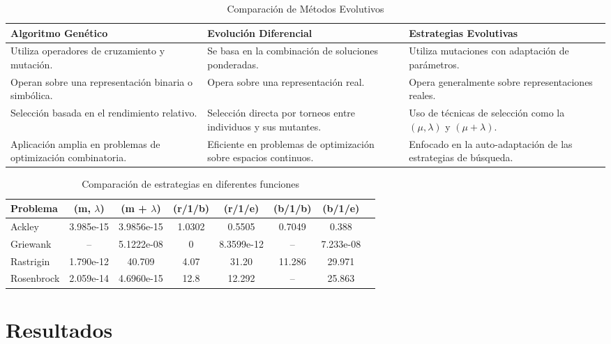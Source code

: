 \documentclass{report}
\begin{document}
\begin{table}[ht]
    \centering
    \caption{Comparación de Métodos Evolutivos}
    \label{tab:comparacion_metodos}
    \begin{tabularx}{\textwidth}{X|X|X}
    \toprule
    \textbf{Algoritmo Genético} & \textbf{Evolución Diferencial} & \textbf{Estrategias Evolutivas} \\
    \midrule
    Utiliza operadores de cruzamiento y mutación. & Se basa en la combinación de soluciones ponderadas. & Utiliza mutaciones con adaptación de parámetros. \\
    \addlinespace
    Operan sobre una representación binaria o simbólica. & Opera sobre una representación real. & Opera generalmente sobre representaciones reales. \\
    \addlinespace
    Selección basada en el rendimiento relativo. & Selección directa por torneos entre individuos y sus mutantes. & Uso de técnicas de selección como la $(\mu, \lambda)$ y $(\mu+\lambda)$. \\
    \addlinespace
    Aplicación amplia en problemas de optimización combinatoria. & Eficiente en problemas de optimización sobre espacios continuos. & Enfocado en la auto-adaptación de las estrategias de búsqueda. \\
    \bottomrule
    \end{tabularx}
\end{table}

\begin{table}[ht]
\centering
\caption{Comparación de estrategias en diferentes funciones}
\begin{tabular}{>{\raggedright}p{3cm}ccccccc}
\toprule
\textbf{Problema} & \textbf{(m, $\lambda$)} & \textbf{(m + $\lambda$)} & \textbf{(r/1/b)} & \textbf{(r/1/e)} & \textbf{(b/1/b)} & \textbf{(b/1/e)} \\
\midrule
Ackley & 3.985e-15 & 3.9856e-15 & 1.0302 & 0.5505 & 0.7049 & 0.388 \\
Griewank & -- & 5.1222e-08 & 0 & 8.3599e-12 & -- & 7.233e-08 \\
Rastrigin & 1.790e-12 & 40.709 & 4.07 & 31.20 & 11.286 & 29.971 \\
Rosenbrock & 2.059e-14 & 4.6960e-15 & 12.8 & 12.292 & -- & 25.863 \\
\bottomrule
\end{tabular}
\end{table}

\section{Resultados}
\end{document}

